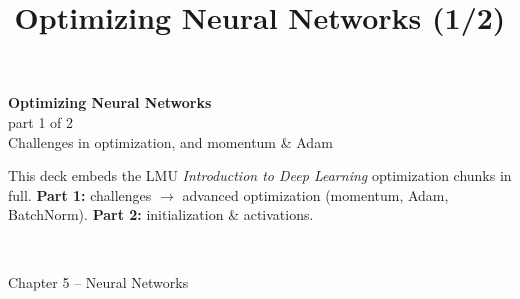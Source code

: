 \documentclass[aspectratio=43]{beamer}
\title{Optimizing Neural Networks (1/2)}
\date{}
\begin{document}
\begin{frame}[plain]
  \vfill
  \begin{center}
    {\Large\color{popblue}\textbf{Optimizing Neural Networks}}\\[0.3em]
    {\normalsize\color{gray} part 1 of 2}\\[0.4em]
    {\large Challenges in optimization, and momentum \& Adam}\\[1.0em]
    \begin{minipage}{0.86\textwidth}\centering\small
      This deck embeds the LMU \emph{Introduction to Deep Learning} optimization chunks in full.
      \textbf{Part 1:} challenges $\rightarrow$ advanced optimization (momentum, Adam,
      BatchNorm). \textbf{Part 2:} initialization \& activations.
    \end{minipage}\\[0.9em]
  \end{center}
  \vfill
  {\footnotesize\color{gray} Chapter 5 -- Neural Networks}
\end{frame}


\end{document}
